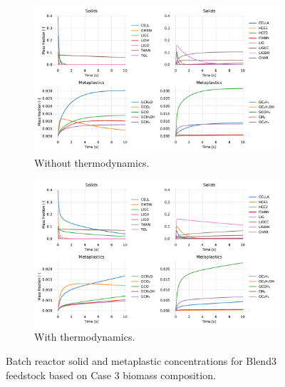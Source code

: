 \begin{figure}[H]
    \begin{subfigure}{\textwidth}
        \centering
        \includegraphics[width=\textwidth]{figures/blend3-case3-solids-meta.pdf}
        \caption{Without thermodynamics.}
    \end{subfigure}
    \begin{subfigure}{\textwidth}
        \centering
        \includegraphics[width=\textwidth]{figures/blend3-case3-solids-meta-thermo.pdf}
        \caption{With thermodynamics.}
    \end{subfigure}
    \caption{Batch reactor solid and metaplastic concentrations for Blend3 feedstock based on Case 3 biomass composition.}
    \label{fig:blend3-case3-solids-meta}
\end{figure}

